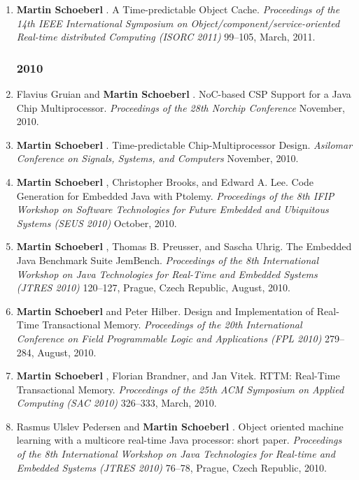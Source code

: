 \begin{enumerate}
\item {\bf Martin Schoeberl }.
 A Time-predictable Object Cache.
 \emph{Proceedings of the 14th IEEE International Symposium on Object/component/service-oriented Real-time distributed Computing (ISORC 2011)} 99--105, March, 2011.


\subsubsection*{2010}

\item Flavius Gruian and {\bf Martin Schoeberl }.
 NoC-based CSP Support for a Java Chip Multiprocessor.
 \emph{Proceedings of the 28th Norchip Conference} November, 2010.

\item {\bf Martin Schoeberl }.
 Time-predictable Chip-Multiprocessor Design.
 \emph{Asilomar Conference on Signals, Systems, and Computers} November, 2010.

\item {\bf Martin Schoeberl }, Christopher Brooks, and Edward A. Lee.
 Code Generation for Embedded Java with Ptolemy.
 \emph{Proceedings of the 8th IFIP Workshop on Software Technologies for Future Embedded and Ubiquitous Systems (SEUS 2010)} October, 2010.

\item {\bf Martin Schoeberl }, Thomas B. Preusser, and Sascha Uhrig.
 The Embedded Java Benchmark Suite JemBench.
 \emph{Proceedings of the 8th International Workshop on Java Technologies for Real-Time and Embedded Systems (JTRES 2010)} 120--127, Prague, Czech Republic, August, 2010.

\item {\bf Martin Schoeberl } and Peter Hilber.
 Design and Implementation of Real-Time Transactional Memory.
 \emph{Proceedings of the 20th International Conference on Field Programmable Logic and Applications (FPL 2010)} 279--284, August, 2010.

\item {\bf Martin Schoeberl }, Florian Brandner, and Jan Vitek.
 RTTM: Real-Time Transactional Memory.
 \emph{Proceedings of the 25th ACM Symposium on Applied Computing (SAC 2010)} 326--333, March, 2010.

\item Rasmus Ulslev Pedersen and {\bf Martin Schoeberl }.
 Object oriented machine learning with a multicore real-time Java processor: short paper.
 \emph{Proceedings of the 8th International Workshop on Java Technologies for Real-time and Embedded Systems (JTRES 2010)} 76--78, Prague, Czech Republic, 2010.


\end{enumerate}
